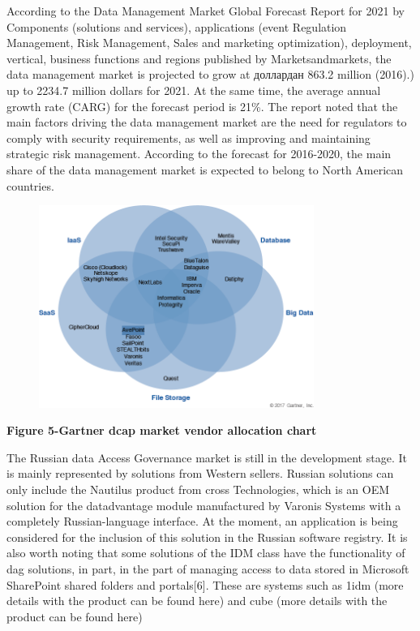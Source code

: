 According to the Data Management Market Global Forecast Report for 2021
by Components (solutions and services), applications (event Regulation
Management, Risk Management, Sales and marketing optimization),
deployment, vertical, business functions and regions published by
Marketsandmarkets, the data management market is projected to grow at
доллардан 863.2 million (2016).) up to 2234.7 million dollars for 2021.
At the same time, the average annual growth rate (CARG) for the forecast
period is 21\%. The report noted that the main factors driving the data
management market are the need for regulators to comply with security
requirements, as well as improving and maintaining strategic risk
management. According to the forecast for 2016-2020, the main share of
the data management market is expected to belong to North American
countries.

\begin{figure}[H]
	\centering
	\includegraphics[width=0.8\textwidth]{assets/67}
	\caption*{}
\end{figure}

{\bfseries Figure 5-Gartner dcap market vendor allocation chart}

The Russian data Access Governance market is still in the development
stage. It is mainly represented by solutions from Western sellers.
Russian solutions can only include the Nautilus product from cross
Technologies, which is an OEM solution for the datadvantage module
manufactured by Varonis Systems with a completely Russian-language
interface. At the moment, an application is being considered for the
inclusion of this solution in the Russian software registry. It is also
worth noting that some solutions of the IDM class have the functionality
of dag solutions, in part, in the part of managing access to data stored
in Microsoft SharePoint shared folders and portals{[}6{]}. These are
systems such as 1idm (more details with the product can be found here)
and cube (more details with the product can be found here)

